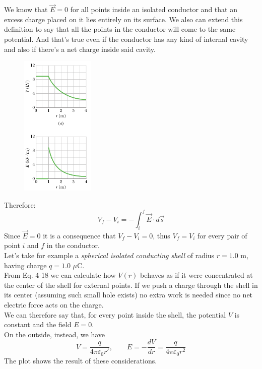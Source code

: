 \documentclass[12pt, a4paper]{article}
\begin{document}
		We know that $\vec{E} = 0$ for all points inside an isolated conductor and that an excess charge placed on it lies entirely on its surface. We also can extend this definition to say that all the points in the conductor will come to the same potential. And that's true even if the conductor has any kind of internal cavity and also if there's a net charge inside said cavity. 
		\begin{figure}
			\centering
			\includegraphics[width=3.5cm]{Physics2_PNGs/plot-charge-potential.png}
			\caption*{}
			\label{fig:plot-charge-potential.png}
		\end{figure}
		Therefore:
		\begin{equation*}
			V_f - V_i = - \int_{i}^{f} \vec{E} \cdot d\vec{s}
		\end{equation*}
		Since $\vec{E} = 0$ it is a	consequence that $V_f - V_i = 0$, thus $V_f = V_i$ for every pair of point $i$ and $f$ in the conductor. \\
		Let's take for example a \textit{spherical isolated	conducting shell} of radius $r = 1.0$ m, having charge $q = 1.0$ $\mu$C. \\
		From Eq. 4-18 we can calculate how $V(r)$ behaves as if it were concentrated at the center of the shell for external points. If we push a charge through the shell in its center (assuming such small hole exists) no extra work is needed since no net electric force acts on the charge. \\
		We can therefore say that, for every point inside the shell, the potential $V$ is constant and the field $E = 0$. \\
		On the outside, instead,  we have 
		\[
			V = \frac{q}{4 \pi \varepsilon_0 r'}, \quad \quad
			E = - \frac{dV}{dr} = \frac{q}{4 \pi \varepsilon_0 r^2}
		\]
		The plot shows the result of these considerations.
		
		
		
\end{document}
